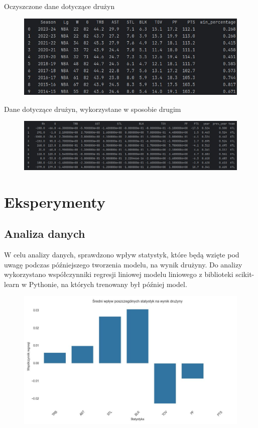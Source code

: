 \documentclass{article}
\begin{document}
Oczyszczone dane dotyczące drużyn
\begin{figure}[htp]
    \centering
    \includegraphics[width=16cm]{cleaned_teams.jpg}
    \label{fig:barplot}
\end{figure}

Dane dotyczące drużyn, wykorzystane w sposobie drugim
\begin{figure}[htp]
    \centering
    \includegraphics[width=16cm]{merged_data.jpg}
    \label{fig:barplot}
\end{figure}
\newpage


\section{Eksperymenty}

\subsection{Analiza danych}

W celu analizy danych, sprawdzono wpływ statystyk, które będą wzięte pod uwagę podczas późniejszego tworzenia modelu, na wynik drużyny. Do analizy wykorzystano współczynniki regresji liniowej modelu liniowego z biblioteki scikit-learn w Pythonie, na których trenowany był później model.

\begin{figure}[htp]
    \centering
    \includegraphics[width=16cm]{barplot.jpg}
    \label{fig:barplot}
\end{figure}
\end{document}
